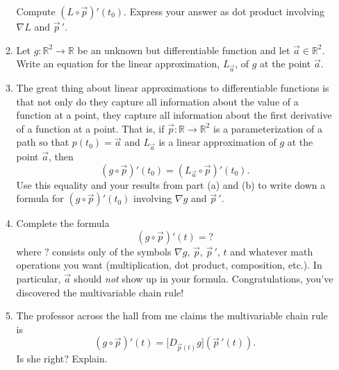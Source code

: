 \documentclass[letter]{article}
\newcommand{\R}{\mathbb{R}}
\begin{document}
\begin{enumerate}
\begin{enumerate}
					Compute $(L\circ \vec p)'(t_0)$.  Express your answer as dot product
					involving $\nabla L$ and $\vec p\,'$.
				\item Let $g:\R^2\to\R$ be an unknown but differentiable function and let $\vec a\in\R^2$.
					Write an equation for the linear approximation, $L_{\vec a}$, of $g$ at the point $\vec a$.
				\item The great thing about linear approximations to differentiable functions 
					is that not only do they capture all
					information about the value of a function at a point, they capture all information
					about the first derivative of a function at a point.  That is, if
					$\vec p:\R\to\R^2$ is a parameterization of a path so that $p(t_0)=\vec a$
					and $L_{\vec a}$ is a linear approximation of $g$ at the point $\vec a$, then
					\[
						(g\circ \vec p)'(t_0) = (L_{\vec a}\circ \vec p)'(t_0).
					\]
					Use this equality and your results from part (a) and (b) to write down a formula
					for $(g\circ \vec p)'(t_0)$ involving $\nabla g$ and $\vec p\,'$.
				\item Complete the formula
					\[
						(g\circ \vec p)'(t) = ?
					\]
					where $?$ consists only of the symbols $\nabla g$, $\vec p$, $\vec p\,'$, $t$ and whatever
					math operations you want (multiplication, dot product, composition, etc.).  In particular,
					$\vec a$ should \emph{not} show up in your formula.  Congratulations,
					you've discovered the multivariable chain rule!
				\item The professor across the hall from me claims the multivariable chain rule is
					\[
						(g\circ \vec p)'(t) = \Big[D_{\vec p(t)}g\Big](\vec p\,'(t)).
					\]
					Is she right? Explain.
			\end{enumerate}

\end{enumerate}
\end{document}
